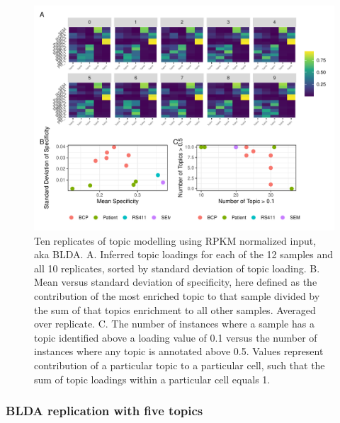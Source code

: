 \begin{figure}
    \centering
    \includegraphics[width=\textwidth]{plot/ch5/mll_redo_reps_bigwig.pdf}
    \caption{Ten replicates of topic modelling using RPKM normalized input, aka BLDA. A. Inferred topic loadings for each of the 12 samples and all 10 replicates, sorted by standard deviation of topic loading. B. Mean versus standard deviation of specificity, here defined as the contribution of the most enriched topic to that sample divided by the sum of that topics enrichment to all other samples. Averaged over replicate. C. The number of instances where a sample has a topic identified above a loading value of 0.1 versus the number of instances where any topic is annotated above 0.5. Values represent contribution of a particular topic to a particular cell, such that the sum of topic loadings within a particular cell equals 1.}
    \label{fig:mll_reps}
\end{figure}

\subsubsection{BLDA replication with five topics}

